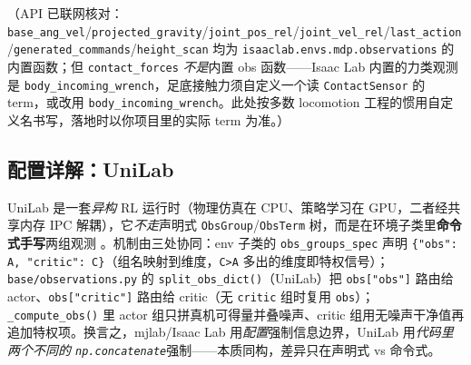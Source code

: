 （API 已联网核对：\texttt{base\_ang\_vel}/\texttt{projected\_gravity}/\texttt{joint\_pos\_rel}/\texttt{joint\_vel\_rel}/\texttt{last\_action}/\texttt{generated\_commands}/\texttt{height\_scan} 均为 \texttt{isaaclab.envs.mdp.observations} 的内置函数；但 \texttt{contact\_forces} \emph{不是}内置 obs 函数——Isaac Lab 内置的力类观测是 \texttt{body\_incoming\_wrench}，足底接触力须自定义一个读 \texttt{ContactSensor} 的 term，或改用 \texttt{body\_incoming\_wrench}。此处按多数 locomotion 工程的惯用自定义名书写，落地时以你项目里的实际 term 为准。）

\subsection{配置详解：UniLab}
\label{sec:rlmc-priv-cfg-unilab}

UniLab 是一套\emph{异构} RL 运行时（物理仿真在 CPU、策略学习在 GPU，二者经共享内存 IPC 解耦），它\emph{不走}声明式 \verb|ObsGroup|/\verb|ObsTerm| 树，而是在环境子类里\textbf{命令式手写}两组观测 \cite{unilab2026}。机制由三处协同：env 子类的 \verb|obs_groups_spec| 声明 \verb|{"obs": A, "critic": C}|（组名映射到维度，\verb|C>A| 多出的维度即特权信号）；\verb|base/observations.py| 的 \verb|split_obs_dict()|（UniLab）把 \verb|obs["obs"]| 路由给 actor、\verb|obs["critic"]| 路由给 critic（无 \verb|critic| 组时复用 \verb|obs|）；\verb|_compute_obs()| 里 actor 组只拼真机可得量并叠噪声、critic 组用无噪声干净值再追加特权项。换言之，mjlab/Isaac Lab 用\emph{配置}强制信息边界，UniLab 用\emph{代码里两个不同的 \texttt{np.concatenate}}强制——本质同构，差异只在声明式 vs 命令式。

